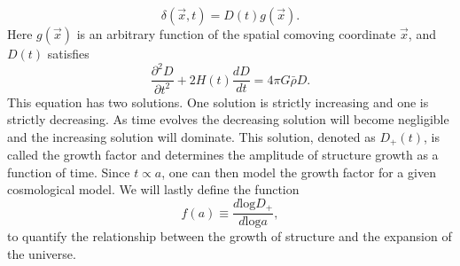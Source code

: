 \begin{equation}
    \delta(\vec{x}, t) = D(t)g(\vec{x}).
\end{equation}
Here $g(\vec{x})$ is an arbitrary function of the spatial comoving coordinate
$\vec{x}$, and $D(t)$ satisfies
\begin{equation}\label{eq:growthfacD}
    \frac{\partial^2 D}{\partial t^2} + 2H(t) \frac{d D}{dt}=4\pi G\bar{\rho}D.
\end{equation}
This equation has two solutions. One solution is strictly increasing and one is
strictly decreasing. As time evolves the decreasing solution will become negligible
and the increasing solution will dominate. This solution, denoted as $D_+(t)$,
is called the growth factor and determines the amplitude of structure growth as
a function of time. Since $t\propto a$, one can then model the growth factor for
a given cosmological model. We will lastly define the function
\begin{equation}\label{eq:growthfac}
    f(a) \equiv \frac{d\mathrm{ log} D_+}{d\mathrm{log} a},
\end{equation}
to quantify the relationship between the growth of structure and the expansion
of the universe.
